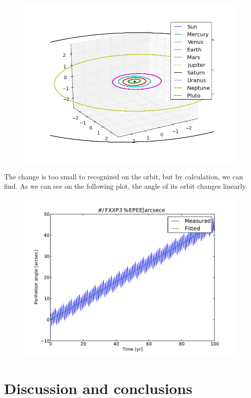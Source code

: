 \documentclass[10pt]{article}
\begin{document}
\begin{multicols}{2}
\begin{figure}[H]
    \centering
    \includegraphics[width=1.0\linewidth]{../results/full_system_inner.png}
    \label{fig:name}
\end{figure}
The change is too small to recognized on the orbit, but by calculation, we
can find. As we can see on the following plot, the angle of its orbit
changes linearly.
\begin{figure}[H]
    \centering
    \includegraphics[width=1.0\linewidth]{../results/peri_precession}
    \label{fig:name}
\end{figure}


\section{Discussion and conclusions}


\end{multicols}
\end{document}
